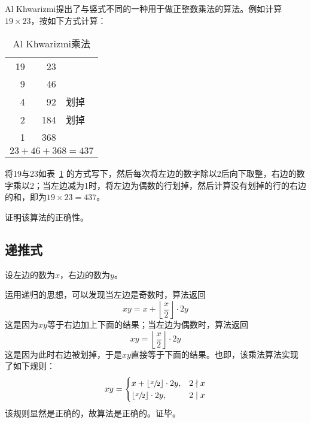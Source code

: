 

Al Khwarizmi提出了与竖式不同的一种用于做正整数乘法的算法。例如计算$19\times23$，按如下方式计算：

\begin{table}[htbp]
  \centering
  \begin{tabular}{rrl}
    19 &  23 & \\
     9 &  46 & \\
     4 &  92 & 划掉 \\
     2 & 184 & 划掉 \\
     1 & 368 & \\ \midrule
    \multicolumn{3}{r}{$23 + 46 + 368 = 437$}  \\
  \end{tabular}
  \caption{Al Khwarizmi乘法} \label{tab:007C}
\end{table}

将19与23如表~\ref{tab:007C} 的方式写下，然后每次将左边的数字除以2后向下取整，右边的数字乘以2；当左边减为1时，将左边为偶数的行划掉，然后计算没有划掉的行的右边的和，即为$19\times23 = 437$。

证明该算法的正确性。

\subsection{递推式}

设左边的数为$x$，右边的数为$y$。

运用递归的思想，可以发现当左边是奇数时，算法返回
\[ xy = x + \left\lfloor\frac x2\right\rfloor\cdot2y \]
这是因为$xy$等于右边加上下面的结果；当左边为偶数时，算法返回
\[ xy = \left\lfloor\frac x2\right\rfloor\cdot2y \]
这是因为此时右边被划掉，于是$xy$直接等于下面的结果。也即，该乘法算法实现了如下规则：
\[ xy = \begin{cases}
  x + \left\lfloor\sfrac x2\right\rfloor\cdot2y, & 2 \nmid x \\
  \left\lfloor\sfrac x2\right\rfloor\cdot2y, & 2 \mid x \\
\end{cases} \]
该规则显然是正确的，故算法是正确的。证毕。

